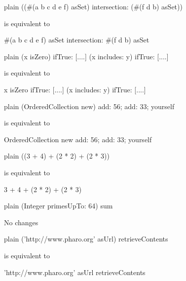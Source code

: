 \documentclass[10pt,twoside,english]{_support/latex/sbabook/sbabook}
\begin{document}
\begin{displaycode}{plain}
((#(a b c d e f) asSet) intersection: (#(f d b) asSet))

is equivalent to 

#(a b c d e f) asSet intersection: #(f d b) asSet
\end{displaycode}

\begin{displaycode}{plain}
(x isZero)
     ifTrue: [....]
(x includes: y)
     ifTrue: [....]
	 
is equivalent to 


x isZero
     ifTrue: [....]
(x includes: y)
     ifTrue: [....]
\end{displaycode}

\begin{displaycode}{plain}
(OrderedCollection new)
    add: 56; 
    add: 33; 
    yourself

is equivalent to

OrderedCollection new
	    add: 56; 
	    add: 33; 
	    yourself
\end{displaycode}

\begin{displaycode}{plain}
((3 + 4) + (2 * 2) + (2 * 3))

is equivalent to

3 + 4 + (2 * 2) + (2 * 3)
\end{displaycode}

\begin{displaycode}{plain}
(Integer primesUpTo: 64) sum

No changes
\end{displaycode}

\begin{displaycode}{plain}
('http://www.pharo.org' asUrl) retrieveContents

is equivalent to 

'http://www.pharo.org' asUrl retrieveContents
\end{displaycode}


\backmatter



\end{document}
